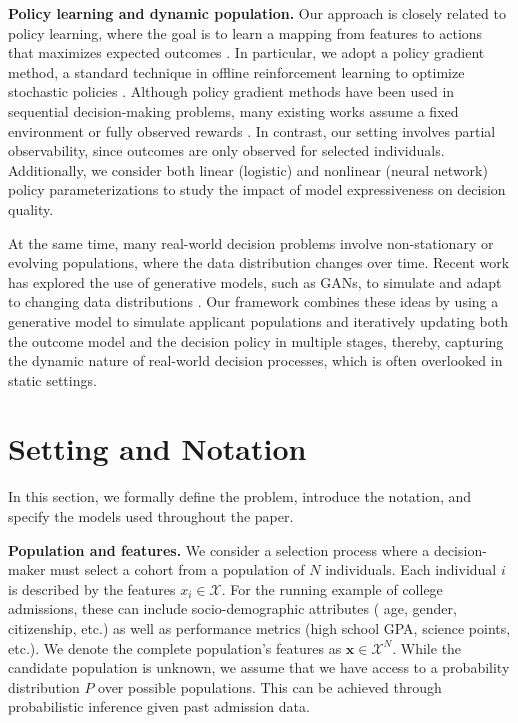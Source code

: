\documentclass[acmlarge]{acmart-ecaf}
\newcommand {\pop} {N}
\newcommand {\feat} {x}
\newcommand {\Pfeat} {\mathbf{x}}
\newcommand {\featSpace} {\mathcal{X}}
\begin{document}
\textbf{Policy learning and dynamic population.}
Our approach is closely related to policy learning, where the goal is to learn a mapping from features to actions that maximizes expected outcomes \cite{ athey2021policy}. In particular, we adopt a policy gradient method, a standard technique in offline reinforcement learning to optimize stochastic policies \cite{levine2020offline,sutton2018reinforcement}. Although policy gradient methods have been used in sequential decision-making problems, many existing works assume a fixed environment or fully observed rewards \cite{parisi2014policy,wang2016knowledge}. In contrast, our setting involves partial observability, since outcomes are only observed for selected individuals. Additionally, we consider both linear (logistic) and nonlinear (neural network) policy parameterizations to study the impact of model expressiveness on decision quality.

At the same time, many real-world decision problems involve non-stationary or evolving populations, where the data distribution changes over time. Recent work has explored the use of generative models, such as GANs, to simulate and adapt to changing data distributions \cite{goodfellow2014generative}. Our framework combines these ideas by using a generative model to simulate applicant populations and iteratively updating both the outcome model and the decision policy in multiple stages, thereby, capturing the dynamic nature of real-world decision processes, which is often overlooked in static settings.

\section{Setting and Notation} 

In this section, we formally define the problem, introduce the notation, and specify the models used throughout the paper.

\textbf{Population and features.} We consider a selection process where a decision-maker must select a cohort from a population of $\pop$ individuals. Each individual $i$ is described by the features $\feat_i \in \featSpace$. For the running example of college admissions, these  can include socio-demographic attributes ( age, gender, citizenship, etc.) as well as performance metrics (high school GPA, science points, etc.). 
We denote the complete population's features as $\Pfeat \in \featSpace^\pop$. While the candidate population is unknown, we assume that we have access to a probability distribution $P$ over possible populations. This can be achieved through probabilistic inference given past admission data.
\end{document}
